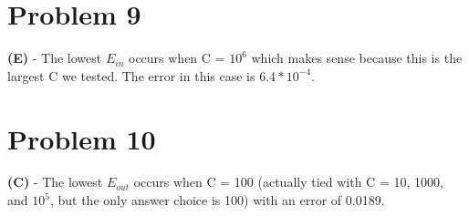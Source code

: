 \documentclass[10pt,letter]{article}
\begin{document}
\section*{Problem 9}

\textbf{(E)} - The lowest $E_{in}$ occurs when C = $10^6$ which makes sense because this is the largest C we tested. The error in this case is $6.4 * 10^{-4}$.

\section*{Problem 10}

\textbf{(C)} - The lowest $E_{out}$ occurs when C = 100 (actually tied with C = 10, 1000, and $10^5$, but the only answer choice is 100) with an error of 0.0189.
\end{document}
